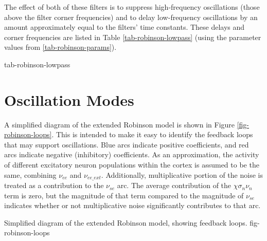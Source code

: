 The effect of both of these filters is to suppress high-frequency
oscillations (those above the filter corner frequencies) and to delay
low-frequency oscillations by an amount approximately equal to the filters'
time constants. These delays and corner frequencies are listed in Table
\ref{tab-robinson-lowpass} (using the parameter values from
\ref{tab-robinson-params}).

{tab-robinson-lowpass}

%
%
\section{Oscillation Modes}
\label{sect-robinson-math-modes}

A simplified diagram of the extended Robinson model is shown in Figure
\ref{fig-robinson-loops}. This is intended to make it easy to identify the
feedback loops that may support oscillations. Blue arcs indicate positive
coefficients, and red arcs indicate negative (inhibitory) coefficients.
As an approximation, the activity of different excitatory neuron populations
within the cortex is assumed to be the same, combining $\nu_{ee}$ and
$\nu_{ee\_ext}$. Additionally, multiplicative portion of the noise is
treated as a contribution to the $\nu_{se}$ arc. The average contribution of
the $\chi \sigma_n \nu_n$ term is zero, but the magnitude of that term
compared to the magnitude of $\nu_{se}$ indicates whether or not
multiplicative noise significantly contributes to that arc.

{Simplified diagram of the extended Robinson model, showing feedback loops.}
{fig-robinson-loops}

